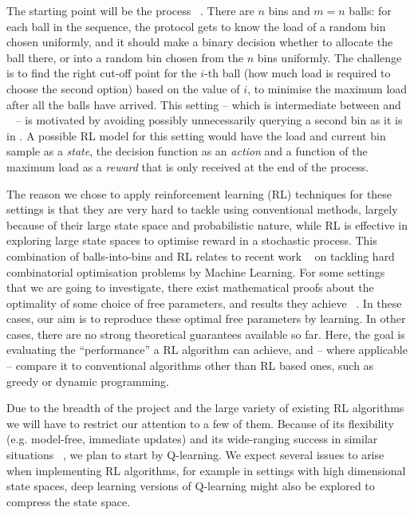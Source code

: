 The starting point will be the \TwoThinning process ~\cite{feldheim2021thinning}. There are $n$ bins and $m=n$ balls: for each ball in the sequence, the protocol gets to know the load of a random bin chosen uniformly, and it should make a binary decision whether to allocate the ball there, or into a random bin chosen from the $n$ bins uniformly. The challenge is to find the right cut-off point for the $i$-th ball (how much load is required to choose the second option) based on the value of $i$, to minimise the maximum load after all the balls have arrived. This setting -- which is intermediate between \OneChoice and \TwoChoice ~\cite{feldheim2021thinning} -- is motivated by avoiding possibly unnecessarily querying a second bin as it is in \TwoChoice. A possible RL model for this setting would have the load and current bin sample as a \textit{state}, the decision function as an \textit{action} and a function of the maximum load as a \textit{reward} that is only received at the end of the process.


The reason we chose to apply reinforcement learning (RL) techniques for these settings is that they are very hard to tackle using conventional methods, largely because of their large state space and probabilistic nature, while RL is effective in exploring large state spaces to optimise reward in a stochastic process. This combination of balls-into-bins and RL relates to recent work ~\cite{mitzenmacher2020algorithms} on tackling hard combinatorial optimisation problems by Machine Learning. For some settings that we are going to investigate, there exist mathematical proofs about the optimality of some choice of free parameters, and results they achieve ~\cite{feldheim2021thinning}. In these cases, our aim is to reproduce these optimal free parameters by learning. In other cases, there are no strong theoretical guarantees available so far. Here, the goal is evaluating the ``performance'' a RL algorithm can achieve, and -- where applicable -- compare it to conventional algorithms other than RL based ones, such as greedy or dynamic programming.

Due to the breadth of the project and the large variety of existing RL algorithms we will have to restrict our attention to a few of them. Because of its flexibility (e.g. model-free, immediate updates) and its wide-ranging success in similar situations ~\cite{jang2019q}, we plan to start by Q-learning. We expect several issues to arise when implementing RL algorithms, for example in settings with high dimensional state spaces, deep learning versions of Q-learning might also be explored to compress the state space.



